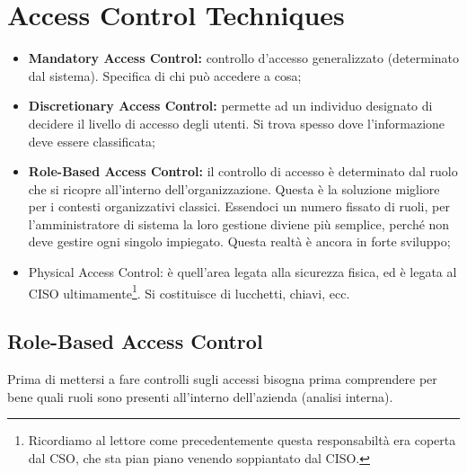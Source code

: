 \chapter{Access Control Techniques}
\label{AccessControlTechniques}
\begin{itemize}
 \item \textbf{Mandatory Access Control:} controllo d'accesso generalizzato
 (determinato dal sistema). Specifica di chi può accedere a cosa;
 \item \textbf{Discretionary Access Control:} permette ad un individuo
 designato di decidere il livello di accesso degli utenti.
 Si trova spesso dove l'informazione deve essere classificata;
 \item \textbf{Role-Based Access Control:} il controllo di accesso è
 determinato dal ruolo che si ricopre all'interno dell'organizzazione.
 Questa è la soluzione migliore per i contesti
 organizzativi classici. Essendoci un numero fissato di ruoli, per
 l'amministratore di sistema la loro gestione diviene più semplice,
 perché non deve gestire ogni singolo impiegato.
 Questa realtà è ancora in forte sviluppo;
 \item Physical Access Control: è quell’area legata alla sicurezza
 fisica, ed è legata al CISO ultimamente\footnote{Ricordiamo al lettore
 come precedentemente questa responsabiltà era coperta dal CSO, che sta
 pian piano venendo soppiantato dal CISO.}. Si costituisce di lucchetti,
 chiavi, ecc.

\end{itemize}


\section{Role-Based Access Control}

Prima di mettersi a fare controlli sugli accessi bisogna prima comprendere per
bene quali ruoli sono presenti all'interno dell'azienda (analisi interna).

\begin{table}[H]
\centering
{}
\caption{Un esempio di un \textit{Role-Based Access Control}}
\end{table}



